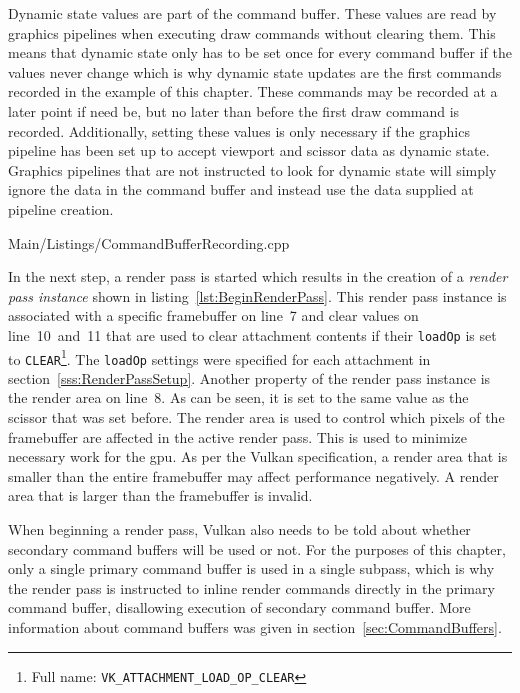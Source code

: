       Dynamic state values are part of the command buffer.
      These values are read by graphics pipelines when executing draw commands without clearing them.
      This means that dynamic state only has to be set once for every command buffer if the values never change which is why dynamic state updates are the first commands recorded in the example of this chapter.
      These commands may be recorded at a later point if need be, but no later than before the first draw command is recorded.
      Additionally, setting these values is only necessary if the graphics pipeline has been set up to accept viewport and scissor data as dynamic state.
      Graphics pipelines that are not instructed to look for dynamic state will simply ignore the data in the command buffer and instead use the data supplied at pipeline creation.

      
      {Main/Listings/CommandBufferRecording.cpp}

      In the next step, a render pass is started which results in the creation of a \textit{render pass instance} shown in listing~\ref{lst:BeginRenderPass}.
      This render pass instance is associated with a specific framebuffer on line~7 and clear values on line~10~and~11 that are used to clear attachment contents if their \lstinline{loadOp} is set to \lstinline{CLEAR}\footnote{Full name: \lstinline{VK_ATTACHMENT_LOAD_OP_CLEAR}}.
      The \lstinline{loadOp} settings were specified for each attachment in section~\ref{sss:RenderPassSetup}.
      Another property of the render pass instance is the render area on line~8.
      As can be seen, it is set to the same value as the scissor that was set before.
      The render area is used to control which pixels of the framebuffer are affected in the active render pass.
      This is used to minimize necessary work for the \gls{gpu}.
      \proofread
      As per the Vulkan specification, a render area that is smaller than the entire framebuffer may affect performance negatively.
      A render area that is larger than the framebuffer is invalid.

      When beginning a render pass, Vulkan also needs to be told about whether secondary command buffers will be used or not.
      For the purposes of this chapter, only a single primary command buffer is used in a single subpass, which is why the render pass is instructed to inline render commands directly in the primary command buffer, disallowing execution of secondary command buffer.
      More information about command buffers was given in section~\ref{sec:CommandBuffers}.

